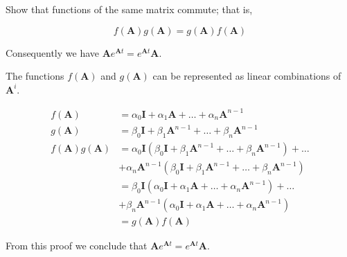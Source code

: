 \item[3.23] Show that functions of the same matrix commute; that is,

\begin{equation*}
 f(\mathbf{A}) g(\mathbf{A}) = g(\mathbf{A})f(\mathbf{A})
\end{equation*}

Consequently we have $\mathbf{A} e^{\mathbf{A}t} = e^{\mathbf{A}t} \mathbf{A}$.

The functions $f(\mathbf{A})$ and $ g(\mathbf{A})$ can be represented as
linear combinations of $\mathbf{A}^i$.

\begin{align*}
 f(\mathbf{A}) &= \alpha_0 \mathbf{I} + \alpha_1 \mathbf{A} + \dots + \alpha_n \mathbf{A}^{n-1}\\
 g(\mathbf{A}) &= \beta_0 \mathbf{I} + \beta_1 \mathbf{A}^{n-1} + \dots + \beta_n \mathbf{A}^{n-1}\\
 f(\mathbf{A}) g(\mathbf{A}) &=
 \alpha_0 \mathbf{I} ( \beta_0 \mathbf{I} + \beta_1 \mathbf{A}^{n-1} + \dots + \beta_n \mathbf{A}^{n-1})
 + \dots \\
 & + \alpha_n \mathbf{A}^{n-1} ( \beta_0 \mathbf{I} + \beta_1 \mathbf{A}^{n-1} + \dots + \beta_n \mathbf{A}^{n-1})\\
 &= \beta_0 \mathbf{I} (\alpha_0 \mathbf{I} + \alpha_1 \mathbf{A} + \dots + \alpha_n \mathbf{A}^{n-1})
 + \dots \\
 & +\beta_n \mathbf{A}^{n-1} (\alpha_0 \mathbf{I} + \alpha_1 \mathbf{A} + \dots + \alpha_n \mathbf{A}^{n-1})\\
 &= g(\mathbf{A})f(\mathbf{A})
 \end{align*}

 From this proof we conclude that $\mathbf{A} e^{\mathbf{A}t} = e^{\mathbf{A}t} \mathbf{A}$.
